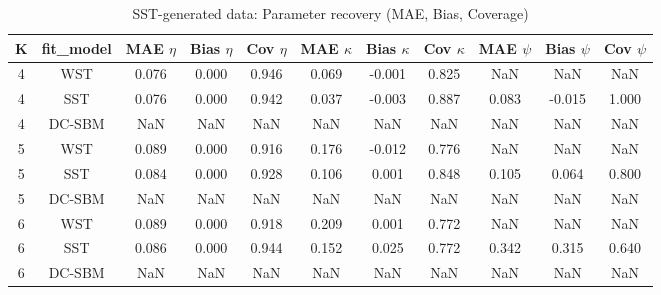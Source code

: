 \begin{table}[!h]
\centering
\caption{SST-generated data: Parameter recovery (MAE, Bias, Coverage)\\\label{tab:sst-params}}
\centering
\begin{tabular}[t]{ccccccccccc}
\toprule
K & fit_model & MAE $\eta$ & Bias $\eta$ & Cov $\eta$ & MAE $\kappa$ & Bias $\kappa$ & Cov $\kappa$ & MAE $\psi$ & Bias $\psi$ & Cov $\psi$\\
\midrule
4 & WST & 0.076 & 0.000 & 0.946 & 0.069 & -0.001 & 0.825 & NaN & NaN & NaN\\
4 & SST & 0.076 & 0.000 & 0.942 & 0.037 & -0.003 & 0.887 & 0.083 & -0.015 & 1.000\\
4 & DC-SBM & NaN & NaN & NaN & NaN & NaN & NaN & NaN & NaN & NaN\\
5 & WST & 0.089 & 0.000 & 0.916 & 0.176 & -0.012 & 0.776 & NaN & NaN & NaN\\
5 & SST & 0.084 & 0.000 & 0.928 & 0.106 & 0.001 & 0.848 & 0.105 & 0.064 & 0.800\\
5 & DC-SBM & NaN & NaN & NaN & NaN & NaN & NaN & NaN & NaN & NaN\\
6 & WST & 0.089 & 0.000 & 0.918 & 0.209 & 0.001 & 0.772 & NaN & NaN & NaN\\
6 & SST & 0.086 & 0.000 & 0.944 & 0.152 & 0.025 & 0.772 & 0.342 & 0.315 & 0.640\\
6 & DC-SBM & NaN & NaN & NaN & NaN & NaN & NaN & NaN & NaN & NaN\\
\bottomrule
\end{tabular}
\end{table}

